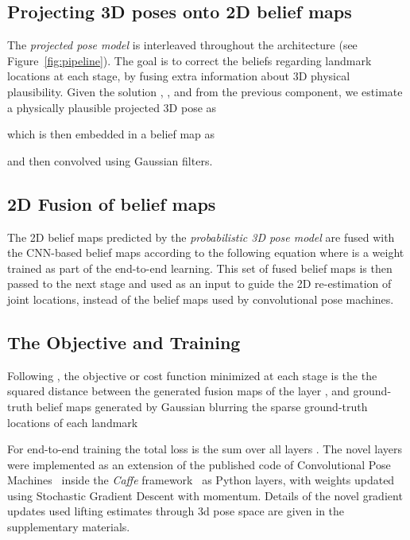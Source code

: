 \documentclass[10pt,twocolumn,letterpaper]{article}
\begin{document}
\subsection{Projecting 3D poses onto 2D belief maps}\vspace{-2mm}
\label{sec:projecting_from_3D_to_2D}
The  \textit{projected pose model} is interleaved throughout the
architecture (see Figure~\ref{fig:pipeline}). The goal is to correct
the beliefs regarding landmark locations at each stage, by fusing
extra information about 3D physical plausibility. Given the solution
, , and  from the previous component, we estimate a physically
plausible projected 3D pose as

which is then embedded in a belief map as

and then convolved using Gaussian filters.

\subsection{2D Fusion of belief maps}\vspace{-2mm}
\label{sec:fusion_layer}
The 2D belief maps predicted by the  \emph{probabilistic 3D pose model}
are fused with the CNN-based belief maps   according
to the following equation 
where  is a weight trained as part of the end-to-end
learning. This set of fused belief maps  is then passed to the next
stage and used as an input to guide the 2D re-estimation of joint
locations, instead of the belief maps  used by convolutional pose machines.



\subsection{The Objective and Training}
Following \cite{wei2016convolutional}, the objective or cost function 
minimized at each stage is the the squared distance between the generated fusion
maps of the layer , and ground-truth belief maps  generated by
Gaussian blurring the sparse ground-truth locations of each landmark 

For end-to-end training the total loss is the sum over all layers . The novel layers were implemented as an extension of the published
code of Convolutional Pose Machines~\cite{wei2016convolutional} inside the
\textit{Caffe} framework~\cite{jia2014caffe} as Python layers, with weights
updated using Stochastic Gradient Descent with momentum. Details of the novel
gradient updates used lifting estimates through 3d pose space are given in the
supplementary materials.
\end{document}
